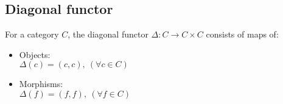 \subsection*{Diagonal functor}
For a category $C$, the diagonal functor $\Delta: C\to C\times C$ consists of
maps of: \parencite{awodey:category_theory}
\begin{itemize}
  \item Objects:\\
    $\Delta(c) = (c, c),\ (\forall c\in C)$
  \item Morphisms:\\
    $\Delta(f) = (f, f),\ (\forall f\in C)$
\end{itemize}